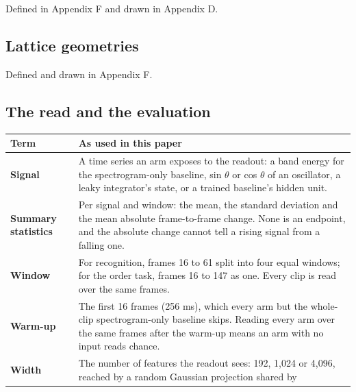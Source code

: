 \documentclass[10pt]{article}
\newcounter{none} %
\begin{document}
Defined in Appendix F and drawn in Appendix D.

\subsection{Lattice geometries}\label{lattice-geometries}

Defined and drawn in Appendix F.

\subsection{The read and the
evaluation}\label{the-read-and-the-evaluation}

{\def\LTcaptype{none} %
\begin{longtable}[]{@{}
  >{\raggedright\arraybackslash}p{}
  >{\raggedright\arraybackslash}p{}@{}}
\toprule\noalign{}
\begin{minipage}[b]{\linewidth}\raggedright
Term
\end{minipage} & \begin{minipage}[b]{\linewidth}\raggedright
As used in this paper
\end{minipage} \\
\midrule\noalign{}
\endhead
\bottomrule\noalign{}
\endlastfoot
\textbf{Signal} & A time series an arm exposes to the readout: a band
energy for the spectrogram-only baseline, sin \ensuremath{\theta} or cos
\ensuremath{\theta} of an oscillator, a leaky integrator's state, or a
trained baseline's hidden unit. \\
\cmidrule{1-2}\textbf{Summary statistics} & Per signal and window: the
mean, the standard deviation and the mean absolute frame-to-frame
change. None is an endpoint, and the absolute change cannot tell a
rising signal from a falling one. \\
\cmidrule{1-2}\textbf{Window} & For recognition, frames 16 to 61 split
into four equal windows; for the order task, frames 16 to 147 as one.
Every clip is read over the same frames. \\
\cmidrule{1-2}\textbf{Warm-up} & The first 16 frames (256 ms), which
every arm but the whole-clip spectrogram-only baseline skips. Reading
every arm over the same frames after the warm-up means an arm with no
input reads chance. \\
\cmidrule{1-2}\textbf{Width} & The number of features the readout sees:
192, 1,024 or 4,096, reached by a random Gaussian projection shared by

\end{longtable}}
\end{document}
